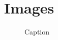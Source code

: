 \documentclass{article}
\newenvironment{changemargin}[2]{%
\begin{list}{}{%
\setlength{\topsep}{0pt}%
\setlength{\leftmargin}{#1}%
\setlength{\rightmargin}{#2}%
\setlength{\listparindent}{\parindent}%
\setlength{\itemindent}{\parindent}%
\setlength{\parsep}{\parskip}%
}%
\item[]}{\end{list}}
\begin{document}
\pagebreak

\section{Images}

\begin{figure}[H]
    \centering
\end{figure}


\begin{changemargin}{+2cm}{+2cm} %

\begin{figure}[H]
    \centering
    \begin{adjustbox}{max size={\textwidth}{\textheight-5em}}
    \end{adjustbox}
    \caption{Caption}
    \label{despliegueV1} %
\end{figure}
\end{changemargin} %
\end{document}
